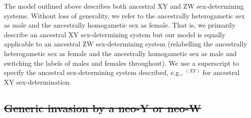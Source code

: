 \documentclass[10pt,letterpaper]{article}
\providecommand{\DIFdel}[1]{{\protect\color{red}\sout{#1}}}                      %
\providecommand{\DIFdelbegin}{} %
\providecommand{\DIFdelend}{} %
\begin{document}
\DIFdelend The model outlined above describes both ancestral XY and ZW sex-determining systems. %
Without loss of generality, we refer to the ancestrally heterogametic sex as male and the ancestrally homogametic sex as female.
That is, we primarily describe an ancestral XY sex-determining system but our model is equally applicable to an ancestral ZW sex-determining system (relabelling the ancestrally heterogametic sex as female and the ancestrally homogametic sex as male and switching the labels of males and females throughout). 
We use a superscript to specify the ancestral sex-determining system described, e.g., $^{(XY)}$ for ancestral XY sex-determination.

\DIFdelbegin \subsection*{\DIFdel{Generic invasion by a neo-Y or neo-W}}
\end{document}
